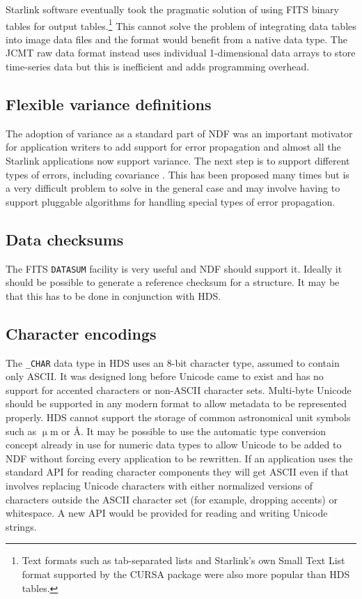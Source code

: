 \documentclass[final,authoryear,5p,times,twocolumn]{elsarticle}
\begin{document}
Starlink software eventually took the pragmatic solution of using FITS
binary tables \citep{1995A&AS..113..159C} for output
tables.\footnote{Text formats such as tab-separated lists and
Starlink's own Small Text List format supported by the CURSA package
\citep{2001ASPC..232..314D} were also more popular than HDS tables.}
This cannot solve the problem of integrating data tables into image
data files and the format would benefit from a native data type. The
JCMT raw data format instead uses individual 1-dimensional data arrays
to store time-series data but this is inefficient and adds programming
overhead.

\subsection{Flexible variance definitions}

The adoption of variance as a standard part of NDF was an important
motivator for application writers to add support for error propagation and
almost all the Starlink applications now support variance. The next
step is to support different types of errors, including
covariance \citep[see e.g.][]{1992ESOC...41...47M}. This has been proposed many times \citep[see
e.g.][]{1991STARB...8...19M} but is a very difficult problem to solve
in the general case and may involve having to support pluggable
algorithms for handling special types of error propagation.

\subsection{Data checksums}

The FITS \texttt{DATASUM} facility \citep{2012arXiv1201.1345S} is very useful and NDF should support
it. Ideally it should be possible to generate a reference checksum for
a structure. It may be that this has to be done in conjunction with
HDS.

\subsection{Character encodings}

The \texttt{\_CHAR} data type in HDS uses an 8-bit character type,
assumed to contain only ASCII. It was designed long before Unicode came to exist
and has no support for accented characters or non-ASCII character
sets. Multi-byte Unicode should be supported in any modern format to
allow metadata to be represented properly. HDS cannot support the
storage of common astronomical unit symbols such as $\upmu$m or \AA.
It may be possible to use the automatic type conversion concept
already in use for numeric data types
to allow Unicode to be added to NDF without forcing every application
to be rewritten. If an application uses the standard API for reading character
components they will get ASCII even if that involves replacing Unicode
characters with either normalized versions of characters outside the
ASCII character set (for example, dropping accents) or whitespace. A new API
would be provided for reading and writing Unicode strings.
\end{document}

